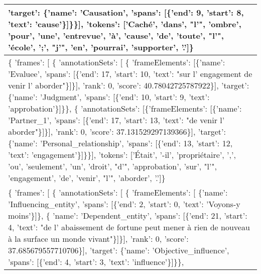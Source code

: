 \documentclass{article}%
\begin{document}
\begin{longtable}{|p{15.5cm}|}
                'target': \{'name': 'Causation', 'spans': {[}\{'end': 9, 'start': 8, 'text': 'cause'\}{]}\}\}{]},\newline%
  'tokens': {[}'Caché', 'dans', "l'", 'ombre', 'pour', 'une', 'entrevue', 'à', 'cause', 'de', 'toute', "l'", 'école', ';', "j'", 'en', 'pourrai', 'supporter', '.'{]}\}\\%
\hline%
\{ 'frames': {[} \{ 'annotationSets': {[} \{ 'frameElements': {[}\{'name': 'Evaluee', 'spans': {[}\{'end': 17, 'start': 10, 'text': "sur l' engagement de venir l' aborder"\}{]}\}{]},\newline%
                                      'rank': 0,\newline%
                                      'score': 40.78042725787922\}{]},\newline%
                'target': \{'name': 'Judgment', 'spans': {[}\{'end': 10, 'start': 9, 'text': 'approbation'\}{]}\}\},\newline%
              \{ 'annotationSets': {[}\{'frameElements': {[}\{'name': 'Partner\_1', 'spans': {[}\{'end': 17, 'start': 13, 'text': "de venir l' aborder"\}{]}\}{]}, 'rank': 0, 'score': 37.131529297139366\}{]},\newline%
                'target': \{'name': 'Personal\_relationship', 'spans': {[}\{'end': 13, 'start': 12, 'text': 'engagement'\}{]}\}\}{]},\newline%
  'tokens': {[}'Était', '{-}il', 'propriétaire', ',', 'ou', 'seulement', 'un', 'droit', "d'", 'approbation', 'sur', "l'", 'engagement', 'de', 'venir', "l'", 'aborder', '.'{]}\}\\%
\hline%
\{ 'frames': {[} \{ 'annotationSets': {[} \{ 'frameElements': {[} \{'name': 'Influencing\_entity', 'spans': {[}\{'end': 2, 'start': 0, 'text': 'Voyons{-}y moins'\}{]}\},\newline%
                                                         \{ 'name': 'Dependent\_entity',\newline%
                                                           'spans': {[}\{'end': 21, 'start': 4, 'text': "de l' abaissement de fortune peut mener à rien de nouveau à la surface un monde vivant"\}{]}\}{]},\newline%
                                      'rank': 0,\newline%
                                      'score': 37.685679557710706\}{]},\newline%
                'target': \{'name': 'Objective\_influence', 'spans': {[}\{'end': 4, 'start': 3, 'text': 'influence'\}{]}\}\},\newline%

\end{longtable}
\end{document}
